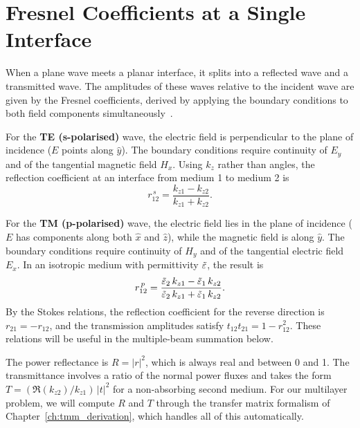 \section{Fresnel Coefficients at a Single Interface}

When a plane wave meets a planar interface, it splits into a reflected wave and
a transmitted wave. The amplitudes of these waves relative to the incident wave
are given by the Fresnel coefficients, derived by applying the boundary
conditions to both field components simultaneously~\cite{hecht}.

For the \textbf{TE (s-polarised)} wave, the electric field is perpendicular to
the plane of incidence ($E$ points along $\hat{y}$). The boundary conditions
require continuity of $E_y$ and of the tangential magnetic field $H_x$. Using
$k_z$ rather than angles, the reflection coefficient at an interface from
medium 1 to medium 2 is
\begin{equation}
  r_{12}^{\,s} = \frac{k_{z1} - k_{z2}}{k_{z1} + k_{z2}}.
  \label{eq:ch2_rs}
\end{equation}

For the \textbf{TM (p-polarised)} wave, the electric field lies in the plane
of incidence ($E$ has components along both $\hat{x}$ and $\hat{z}$), while
the magnetic field is along $\hat{y}$. The boundary conditions require
continuity of $H_y$ and of the tangential electric field $E_x$. In an
isotropic medium with permittivity $\tilde{\varepsilon}$, the result is
\begin{equation}
  r_{12}^{\,p} = \frac{\tilde{\varepsilon}_2\,k_{z1} - \tilde{\varepsilon}_1\,k_{z2}}
                      {\tilde{\varepsilon}_2\,k_{z1} + \tilde{\varepsilon}_1\,k_{z2}}.
  \label{eq:ch2_rp}
\end{equation}
By the Stokes relations, the reflection coefficient for the reverse direction
is $r_{21} = -r_{12}$, and the transmission amplitudes satisfy
$t_{12}t_{21} = 1 - r_{12}^2$. These relations will be useful in the
multiple-beam summation below.

The power reflectance is $R = |r|^2$, which is always real and between 0
and 1. The transmittance involves a ratio of the normal power fluxes and
takes the form $T = (\Re(k_{z2})/k_{z1})\,|t|^2$ for a non-absorbing
second medium. For our multilayer problem, we will compute $R$ and $T$
through the transfer matrix formalism of Chapter~\ref{ch:tmm_derivation},
which handles all of this automatically.

